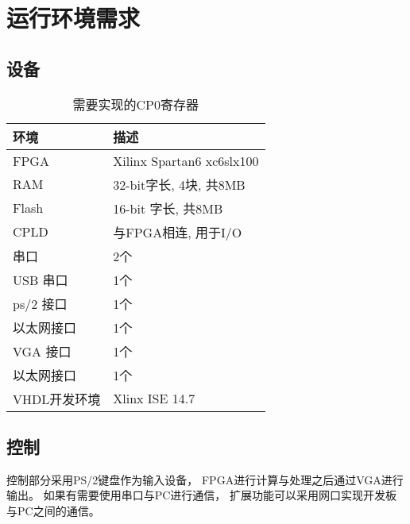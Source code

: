 \section{运行环境需求}
    \subsection{设备}
        \begin{table}[!hbp]
        \centering
        \caption{需要实现的CP0寄存器}
        \begin{tabular}{|l|l|}
        \hline
        环境　& 描述　\\
        \hline
        FPGA & Xilinx Spartan6 xc6slx100 \\
        \hline
        RAM & 32-bit字长, 4块, 共8MB \\
        \hline
        Flash & 16-bit 字长, 共8MB \\
        \hline
        CPLD & 与FPGA相连, 用于I/O \\
        \hline
        串口 & 2个　\\
        \hline
        USB 串口 & 1个 \\
        \hline
        ps/2 接口 & 1个 \\
        \hline
        以太网接口 & 1个 \\
        \hline
        VGA 接口 & 1个 \\
        \hline
        以太网接口 & 1个 \\
        \hline
        VHDL开发环境 & Xlinx ISE 14.7 \\
        \hline
        \end{tabular}
        \end{table}

    \subsection{控制}
        控制部分采用PS/2键盘作为输入设备，%
        FPGA进行计算与处理之后通过VGA进行输出。%
        如果有需要使用串口与PC进行通信，%
        扩展功能可以采用网口实现开发板与PC之间的通信。


